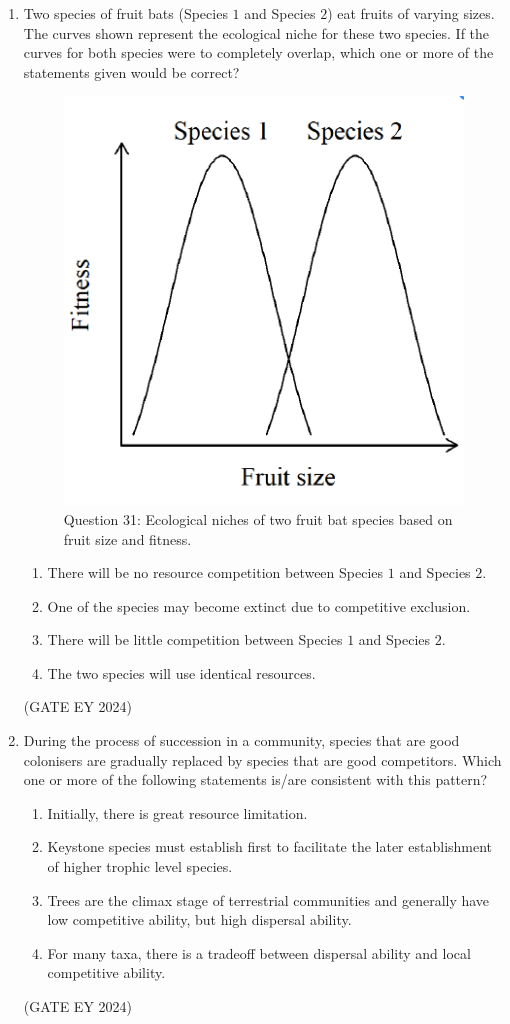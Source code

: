 \documentclass[journal]{IEEEtran}
\begin{document}
\begin{enumerate}
\item Two species of fruit bats (Species $1$ and Species $2$) eat fruits of varying sizes. The curves shown represent the ecological niche for these two species. If the curves for both species were to completely overlap, which one or more of the statements given would be correct?
\begin{figure}[!ht]
    \centering
    \includegraphics[width=0.6\columnwidth]{figs/Q-31.png}
    \caption{Question 31: Ecological niches of two fruit bat species based on fruit size and fitness.}
    \label{Q.31}
\end{figure}
    \begin{enumerate}
        \item There will be no resource competition between Species $1$ and Species $2$.
        \item One of the species may become extinct due to competitive exclusion.
        \item There will be little competition between Species $1$ and Species $2$.
        \item The two species will use identical resources.
    \end{enumerate}
\hfill{(GATE EY 2024)}

\item During the process of succession in a community, species that are good colonisers are gradually replaced by species that are good competitors. Which one or more of the following statements is/are consistent with this pattern?
    \begin{enumerate}
        \item Initially, there is great resource limitation.
        \item Keystone species must establish first to facilitate the later establishment of higher trophic level species.
        \item Trees are the climax stage of terrestrial communities and generally have low competitive ability, but high dispersal ability.
        \item For many taxa, there is a tradeoff between dispersal ability and local competitive ability.
    \end{enumerate}
\hfill{(GATE EY 2024)}


\end{enumerate}
\end{document}
